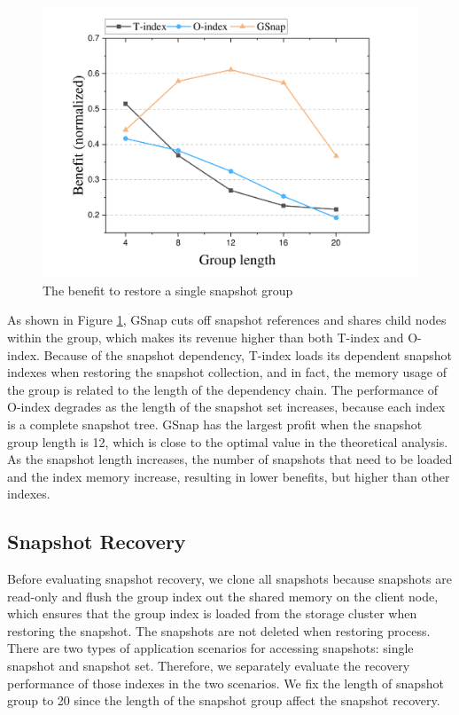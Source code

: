 \documentclass[sigconf, nonacm]{acmart}
\begin{document}
\begin{figure}[htbp]
	\centering
	\includegraphics[width=0.8\columnwidth]{figures/ceph_pic/eval_grouplength.pdf}
	\caption{The benefit to restore a single snapshot group}
	\label{fig:grouplength}
\end{figure}


As shown in Figure \ref{fig:grouplength}, GSnap cuts off snapshot references and shares child nodes within the group, which makes its revenue higher than both T-index and O-index. Because of the snapshot dependency, T-index loads its dependent snapshot indexes when restoring the snapshot collection, and in fact, the memory usage of the group is related to the length of the dependency chain. The performance of O-index degrades as the length of the snapshot set increases, because each index is a complete snapshot tree. GSnap has the largest profit when the snapshot group length is 12, which is close to the optimal value in the theoretical analysis. As the snapshot length increases, the number of snapshots that need to be loaded and the index memory increase, resulting in lower benefits, but higher than other indexes.

\subsection{Snapshot Recovery}
Before evaluating snapshot recovery, we clone all snapshots because snapshots are read-only and flush the group index out the shared memory on the client node, which ensures that the group index is loaded from the storage cluster when restoring the snapshot. The snapshots are not deleted when restoring process. There are two types of application scenarios for accessing snapshots: single snapshot and snapshot set.
Therefore, we separately evaluate the recovery performance of those indexes in the two scenarios.
We fix the length of snapshot group to 20 since the length of the snapshot group affect the snapshot recovery.
\end{document}
